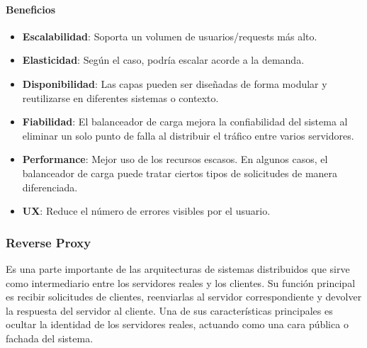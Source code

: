 \documentclass{article}
\begin{document}
		
		
		
		
		
		\paragraph{Beneficios}
		\begin{itemize}	
			\item {\textbf{Escalabilidad}}: Soporta un volumen de usuarios/requests más alto.
			
			\item {\textbf{Elasticidad}}: Según el caso, podría escalar acorde a la demanda.
			
			\item {\textbf{Disponibilidad}}: Las capas pueden ser diseñadas de forma modular y reutilizarse en diferentes sistemas o contexto.
			
			\item {\textbf{Fiabilidad}}: El balanceador de carga mejora la confiabilidad del sistema al eliminar un solo punto de falla al distribuir el tráfico entre varios servidores.
			
			\item {\textbf{Performance}}: Mejor uso de los recursos escasos. En algunos casos, el balanceador de carga puede tratar ciertos tipos de solicitudes de manera diferenciada. 
			
			\item {\textbf{UX}}: Reduce el número de errores visibles por el usuario.
			
		\end{itemize}
		
		
		\subsubsection{Reverse Proxy}
		Es una parte importante de las arquitecturas de sistemas distribuidos que sirve como intermediario entre los servidores reales y los clientes. Su función principal es recibir solicitudes de clientes, reenviarlas al servidor correspondiente y devolver la respuesta del servidor al cliente. Una de sus características principales es ocultar la identidad de los servidores reales, actuando como una cara pública o fachada del sistema.
		
				
\end{document}
